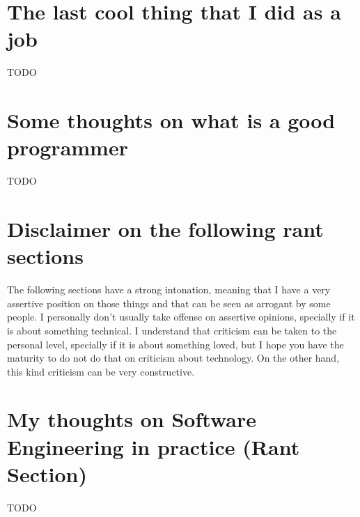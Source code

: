 \documentclass[11pt,a4paper,sans]{moderncv}
\begin{document}
\section{The last cool thing that I did as a job}
TODO

\section{Some thoughts on what is a good programmer}
TODO

\section{Disclaimer on the following rant sections}
The following sections have a strong intonation, meaning that I have a very assertive position on those things and that can be seen as arrogant by some people.
I personally don't usually take offense on assertive opinions, specially if it is about something technical.
I understand that criticism can be taken to the personal level, specially if it is about something loved, but I hope you have the maturity to do not do that on criticism about technology.
On the other hand, this kind criticism can be very constructive.

\section{My thoughts on Software Engineering in practice (Rant Section)}
TODO
\end{document}
